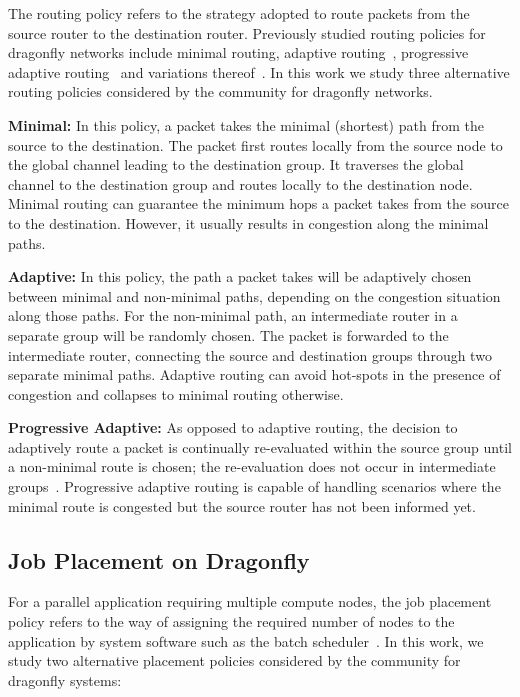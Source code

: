 The routing policy refers to the strategy adopted to route  packets from the source router to the destination router. Previously studied routing policies for dragonfly networks include minimal routing, adaptive routing~\cite{dally-dragonfly}, progressive adaptive routing~\cite{jiang} and variations thereof~\cite{won-prog-adaptive}. In this work we study three alternative routing policies considered by the community for dragonfly networks.

\textbf{Minimal:} In this policy, a packet takes the minimal (shortest) path from the source to the destination. The packet first routes locally from the source node to the global channel leading to the destination group. It traverses the global channel to the destination group and routes locally to the destination node. 
Minimal routing can guarantee the minimum hops a packet takes from the source to the destination. However, it usually results in congestion along the minimal paths. 

\textbf{Adaptive:} In this policy, the path a packet takes will be adaptively chosen between minimal and non-minimal paths, depending on the congestion situation along those paths. For the non-minimal path, an intermediate router in a separate group will be randomly chosen. The packet is forwarded to the intermediate router, connecting the source and destination groups through two separate minimal paths. Adaptive routing can avoid hot-spots in the presence of congestion and collapses to minimal routing otherwise. 

\textbf{Progressive Adaptive:} As opposed to adaptive routing, the decision to adaptively route a packet is continually re-evaluated within the source group until a non-minimal route is chosen; the re-evaluation does not occur in intermediate groups~\cite{jiang}.
Progressive adaptive routing is capable of handling scenarios where the minimal route is congested but the source router has not been informed yet.




\subsection{Job Placement on Dragonfly}
\label{sec:placement-schemes}

For a parallel application requiring multiple compute nodes, the job placement policy refers to the way of assigning the required number of nodes to the application by system software such as the batch scheduler~\cite{tsafrir-tpds-2007}. In this work, we study two alternative placement policies considered by the community for dragonfly systems: 

